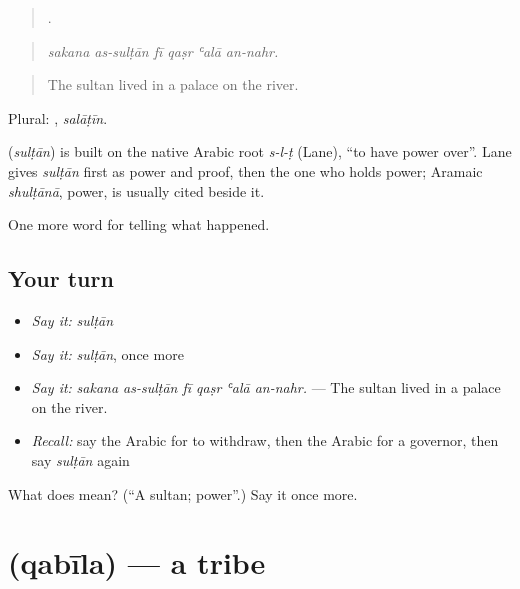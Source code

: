 \begin{quote}
     .
\end{quote}

\begin{quote}
\emph{sakana as-sulṭān fī qaṣr ʿalā an-nahr.}
\end{quote}

\begin{quote}
The sultan lived in a palace on the river.
\end{quote}

Plural: , \emph{salāṭīn}.

\begin{cousinweb}
\textbf{} (\emph{sulṭān}) is built on the native Arabic root \emph{s-l-ṭ} (Lane), \textquotedblleft{}to have power over\textquotedblright{}. Lane gives \emph{sulṭān} first as power and proof, then the one who holds power; Aramaic \emph{shulṭānā}, power, is usually cited beside it.
\end{cousinweb}

\begin{grammarlens}[title={What you've built}]
One more word for telling what happened.
\end{grammarlens}

\subsection*{Your turn}
\begin{itemize}
\raggedright
  \item \emph{Say it:} \emph{sulṭān}
  \item \emph{Say it:} \emph{sulṭān}, once more
  \item \emph{Say it:} \emph{sakana as-sulṭān fī qaṣr ʿalā an-nahr.} — The sultan lived in a palace on the river.
  \item \emph{Recall:} say the Arabic for to withdraw, then the Arabic for a governor, then say \emph{sulṭān} again
\end{itemize}

\begin{tcolorbox}[breakable,colback=teal!4,colframe=teal!35!black,title={Before you move on}]
What does  mean? (\textquotedblleft{}A sultan; power\textquotedblright{}.) Say it once more.
\end{tcolorbox}
\section[\texorpdfstring{\ar{قبيلة} (qabīla)}{قبيلة (qabīla)}]{ (qabīla) — a tribe}

